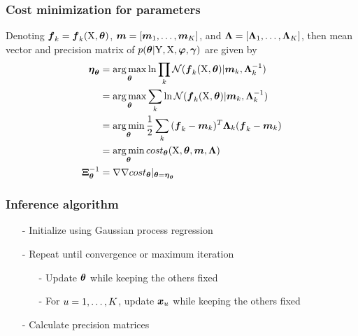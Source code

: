 \begin{frame}[t]
    \frametitle{Cost minimization for parameters}
    Denoting $\boldsymbol{f}_{k} = \boldsymbol{f}_{k}(\mathrm{X}, \boldsymbol{\theta})$, $\boldsymbol{m} = [\boldsymbol{m}_{1},\dots,\boldsymbol{m}_{K}]$, and $\boldsymbol{\Lambda} = [\boldsymbol{\Lambda}_{1},\dots,\boldsymbol{\Lambda}_{K}]$, then mean vector and precision matrix of $p(\boldsymbol{\theta}\vert\mathrm{Y},\mathrm{X},\boldsymbol{\varphi},\boldsymbol{\gamma})$ are given by
    \begin{align}
        \boldsymbol{\eta}_{\boldsymbol{\theta}}
        & = 
        \operatorname*{arg\,max}_{\boldsymbol{\theta}}{
            \ln{
                \prod_k{\mathcal{N}(\boldsymbol{f}_{k}(\mathrm{X}, \boldsymbol{\theta})\vert\boldsymbol{m}_{k},\boldsymbol{\Lambda}_{k}^{-1})}
            }
        }
        \nonumber
        \\
        & = 
        \operatorname*{arg\,max}_{\boldsymbol{\theta}}{
            \sum_k{
                \ln{\mathcal{N}(\boldsymbol{f}_{k}(\mathrm{X}, \boldsymbol{\theta})\vert\boldsymbol{m}_{k},\boldsymbol{\Lambda}_{k}^{-1})}
            }}
        \nonumber
        \\
        & =
        \operatorname*{arg\,min}_{\boldsymbol{\theta}}{
            \frac{1}{2}\sum_k{
                (\boldsymbol{f}_{k} - \boldsymbol{m}_{k})^T\boldsymbol{\Lambda}_{k}(\boldsymbol{f}_{k} - \boldsymbol{m}_{k})
            }
        }
        \nonumber
        \\
        & = 
        \operatorname*{arg\,min}_{\boldsymbol{\theta}}{
            cost_{\boldsymbol{\theta}}(\mathrm{X},\boldsymbol{\theta},\boldsymbol{m},\boldsymbol{\Lambda})
        }
        \label{eq-laplace-theta-cost}
        \\
        \boldsymbol{\Xi}_{\boldsymbol{\theta}}^{-1} 
        & = 
        \nabla\nabla cost_{\boldsymbol{\theta}}\vert_{\boldsymbol{\theta} = \boldsymbol{\eta}_{\boldsymbol{\theta}}}  
        \label{eq-laplace-theta-covariance}    
    \end{align} 
\end{frame}

\begin{frame}[t]
    \frametitle{Inference algorithm}
    \begin{itemize}
        \item[-] Initialize using Gaussian process regression
        \item[-] Repeat until convergence or maximum iteration
        \begin{itemize}
            \item[-] Update $\boldsymbol{\theta}$ while keeping the others fixed
            \item[-] For $u = 1,\dots,K$, update $\boldsymbol{x}_{u}$ while keeping the others fixed
        \end{itemize}
        \item[-] Calculate precision matrices
    \end{itemize}    
\end{frame}

